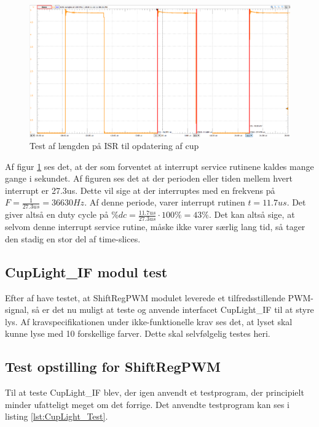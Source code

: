 \documentclass[Modultest/Modultest_main.tex]{subfiles}
\begin{document}
\begin{figure}[H]
    \centering
    \includegraphics[width=\textwidth]{Modultest/CupLight/graphics/Test_isr_length.png}
    \caption{Test af længden på ISR til opdatering af cup}
    \label{fig:cuplight_isr_length}
\end{figure}

Af figur \ref{fig:cuplight_isr_length} ses det, at der som forventet at interrupt service rutinene kaldes mange gange i sekundet. Af figuren ses det at der perioden eller tiden mellem hvert interrupt er 27.3us. Dette vil sige at der interruptes med en frekvens på $F=\frac{1}{27.3us}=36630Hz$. Af denne periode, varer interrupt rutinen $t=11.7us$. Det giver altså en duty cycle på $\%dc=\frac{11.7us}{27.3us}\cdot 100\%=43\%$. Det kan altså sige, at selvom denne interrupt service rutine, måske ikke varer særlig lang tid, så tager den stadig en stor del af time-slices. 

\subsection{CupLight\_IF modul test}
Efter af have testet, at ShiftRegPWM modulet leverede et tilfredsstillende PWM-signal, så er det nu muligt at teste og anvende interfacet CupLight\_IF til at styre lys. Af kravspecifikationen under ikke-funktionelle krav  ses det, at lyset skal kunne lyse med 10 forskellige farver. Dette skal selvfølgelig testes heri.
\subsection{Test opstilling for ShiftRegPWM}
Til at teste CupLight\_IF blev, der igen anvendt et testprogram, der principielt minder ufatteligt meget om det forrige. Det anvendte testprogram kan ses i listing \ref{lst:CupLight_Test}.
\end{document}
